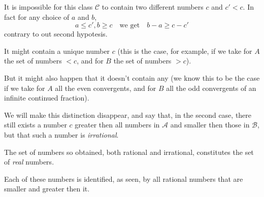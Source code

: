 \documentclass[10pt,letterpaper]{book}
\theoremstyle{definition}
\begin{document}
It is impossible for this class $\mathcal C$ to contain two different numbers $c$ and $c' < c$. In fact for any choice of $a$ and $b$,
\[
  a\leq c', b\geq c\quad\mbox{we get}\quad b-a\geq c-c'
\]
contrary to out second hypotesis.

It might contain a unique number $c$ (this is the case, for example, if we take for $A$ the set of numbers $< c$, and for $B$ the set of numbers $> c$).

But it might also happen that it doesn't contain any (we know this to be the case if we take for $A$ all the even convergents, and for $B$ all the odd convergents of an infinite continued fraction).

We will make this distinction disappear, and say that, in the second case, there still exists a number $c$ greater then all numbers in $\mathcal A$ and smaller then those in $\mathcal B$, but that such a number is \textit{irrational}.

The set of numbers so obtained, both rational and irrational, constitutes the set of \textit{real} numbers.


Each of these numbers is identified, as seen, by all rational numbers that are smaller and greater then it.

\paragraph{}


\begin{thebibliography}{9}

\end{thebibliography}
\end{document}
